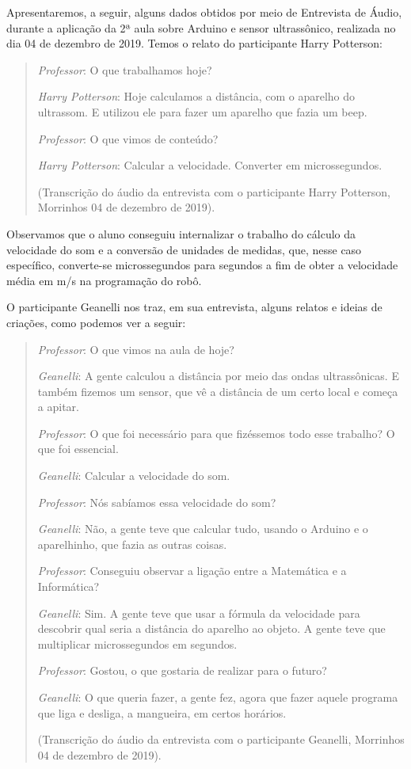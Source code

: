 \documentclass{textolivre}
\begin{document}
Apresentaremos, a seguir, alguns dados obtidos por meio de Entrevista de Áudio, durante a aplicação da 2ª aula sobre Arduino e sensor ultrassônico, realizada no dia 04 de dezembro de 2019. Temos o relato do participante Harry Potterson:

\begin{quote}
\emph{Professor}: O que trabalhamos hoje?

\emph{Harry Potterson}: Hoje calculamos a distância, com o aparelho do ultrassom. E utilizou ele para fazer um aparelho que fazia um beep.

\emph{Professor}: O que vimos de conteúdo?

\emph{Harry Potterson}:  Calcular a velocidade. Converter em microssegundos.

(Transcrição do áudio da entrevista com o participante Harry Potterson, Morrinhos 04 de dezembro de 2019).
\end{quote}

Observamos que o aluno conseguiu internalizar o trabalho do cálculo da velocidade do som e a conversão de unidades de medidas, que, nesse caso específico, converte-se microssegundos para segundos a fim de obter a velocidade média em m/s na programação do robô.

O participante Geanelli nos traz, em sua entrevista, alguns relatos e ideias de criações, como podemos ver a seguir:

\begin{quote}
\emph{Professor}: O que vimos na aula de hoje?

\emph{Geanelli}: A gente calculou a distância por meio das ondas ultrassônicas. E também fizemos um sensor, que vê a distância de um certo local e começa a apitar.

\emph{Professor}: O que foi necessário para que fizéssemos todo esse trabalho? O que foi essencial.

\emph{Geanelli}: Calcular a velocidade do som.

\emph{Professor}: Nós sabíamos essa velocidade do som?

\emph{Geanelli}: Não, a gente teve que calcular tudo, usando o Arduino e o aparelhinho, que fazia as outras coisas.

\emph{Professor}: Conseguiu observar a ligação entre a Matemática e a Informática?

\emph{Geanelli}: Sim. A gente teve que usar a fórmula da velocidade para descobrir qual seria a distância do aparelho ao objeto. A gente teve que multiplicar microssegundos em segundos.

\emph{Professor}: Gostou, o que gostaria de realizar para o futuro?

\emph{Geanelli}: O que queria fazer, a gente fez, agora que fazer aquele programa que liga e desliga, a mangueira, em certos horários.

(Transcrição do áudio da entrevista com o participante Geanelli, Morrinhos 04 de dezembro de 2019).
\end{quote}
\end{document}

